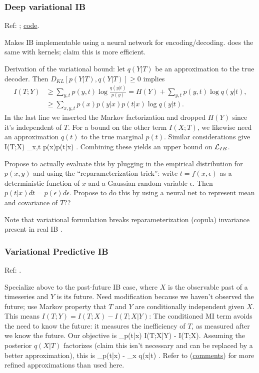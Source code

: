 \documentclass[notitlepage,openany,11pt]{report}
\theoremstyle{plain}%
\numberwithin{equation}{section}
\begin{document}
\subsubsection{Deep variational IB} 
Ref: \cite{AlemiEtAl:16}; \href{https://github.com/alexalemi/vib_demo}{code}.

Makes IB implementable using a neural network for encoding/decoding. \cite{ChalkEtAl:16} does the same with kernels; claim this is more efficient.

Derivation of the variational bound: let $q(Y|T)$ be an approximation to the true decoder. Then $D_{KL}[p(Y|T), q(Y|T)] \geq 0$ implies
\begin{align*}
I(T;Y) &\geq \sum_{y,t} p(y,t) \log \frac{q(y|t)}{p(y)} = H(Y) + \sum_{y,t} p(y,t) \log q(y|t), \\
{} &\geq \sum_{x,y,t} p(x)p(y|x) p(t|x) \log q(y|t).
\end{align*}
In the last line we inserted the Markov factorization and dropped $H(Y)$ since it's independent of $T$. For a bound on the other term $I(X;T)$, we likewise need an approximation $q(t)$ to the true marginal $p(t)$. Similar considerations give 
\be
I(T;X) \leq \sum_{x,t} p(x)p(t|x) \log {}.
\ee
Combining these yields an upper bound on $\mathcal{L}_{IB}$. 

Propose to actually evaluate this by plugging in the empirical distribution for $p(x,y)$  and using the ``reparameterization trick'': write $t=f(x,\epsilon)$ as a deterministic function of $x$ and a Gaussian random variable $\epsilon$. Then $p(t|x)dt = p(\epsilon)d\epsilon$. Propose to do this by using a neural net to represent mean and covariance of $T$??

Note that variational formulation breaks reparameterization (copula) invariance present in real IB \cite{WieczorekEtAl:18,WieczorekRoth:20}.


\subsubsection{Variational Predictive IB} 
Ref: \cite{Alemi:20}.

Specialize above to the past-future IB case, where $X$ is the observable past of a timeseries and $Y$ is its future. Need modification because we haven't observed the future; use Markov property that $T$ and $Y$ are conditionally independent given $X$. This means $I(T;Y) = I(T;X) - I(T; X|Y)$: The conditioned MI term avoids the need to know the future: it measures the inefficiency of $T$, as measured after we know the future. Our objective is
\be
\min_{p(t|x)} I(T;X|Y) - \beta I(T;X).
\ee
Assuming the posterior $q(X|T)$ factorizes (claim this isn't necessary and can be replaced by a better approximation), this is
\be
\min_{p(t|x)} \left\langle \log{} - \beta \sum_{x} \log q(x|t) \right\rangle.
\ee
Refer to \cite{AlemiFischer:18a} (\href{https://openreview.net/forum?id=HJeQToAqKQ}{comments}) for more refined approximations than used here.
\end{document}
